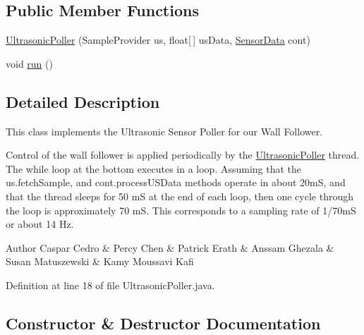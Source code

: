 \subsection*{Public Member Functions}
\begin{DoxyCompactItemize}
\item 
\hyperlink{classca_1_1mcgill_1_1ecse211_1_1sensors_1_1_ultrasonic_poller_a3007841893144cccb37d023f34fb3cfc}{Ultrasonic\+Poller} (Sample\+Provider us, float\mbox{[}$\,$\mbox{]} us\+Data, \hyperlink{classca_1_1mcgill_1_1ecse211_1_1sensors_1_1_sensor_data}{Sensor\+Data} cont)
\item 
void \hyperlink{classca_1_1mcgill_1_1ecse211_1_1sensors_1_1_ultrasonic_poller_acc71fac612a72c197244c71d6cf7b6e1}{run} ()
\end{DoxyCompactItemize}


\subsection{Detailed Description}
This class implements the Ultrasonic Sensor Poller for our Wall Follower.

Control of the wall follower is applied periodically by the \hyperlink{classca_1_1mcgill_1_1ecse211_1_1sensors_1_1_ultrasonic_poller}{Ultrasonic\+Poller} thread. The while loop at the bottom executes in a loop. Assuming that the us.\+fetch\+Sample, and cont.\+process\+U\+S\+Data methods operate in about 20mS, and that the thread sleeps for 50 mS at the end of each loop, then one cycle through the loop is approximately 70 mS. This corresponds to a sampling rate of 1/70mS or about 14 Hz.

\begin{DoxyAuthor}{Author}
Caspar Cedro \& Percy Chen \& Patrick Erath \& Anssam Ghezala \& Susan Matuszewski \& Kamy Moussavi Kafi 
\end{DoxyAuthor}


Definition at line 18 of file Ultrasonic\+Poller.\+java.



\subsection{Constructor \& Destructor Documentation}
\mbox{\label{classca_1_1mcgill_1_1ecse211_1_1sensors_1_1_ultrasonic_poller_a3007841893144cccb37d023f34fb3cfc}} 
